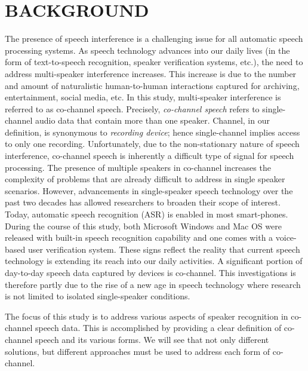 
\chapter{BACKGROUND}
\label{chap:intro}
 
The presence of speech interference is a challenging issue for all automatic speech processing systems. 
As speech technology advances into our daily lives (in the form of text-to-speech recognition, speaker verification systems, etc.), the need to address multi-speaker interference increases. 
This increase is due to the number and amount of naturalistic human-to-human interactions captured for archiving, entertainment, social media, etc. 
In this study, multi-speaker interference is referred to as co-channel speech. 
Precisely, {\it co-channel speech} refers to single-channel audio data that contain more than one speaker. 
Channel, in our definition, is synonymous to {\it recording device}; hence single-channel implies access to only one recording. 
Unfortunately, due to the non-stationary nature of speech interference, co-channel speech is inherently a difficult type of signal for speech processing. 
The presence of multiple speakers in co-channel increases the complexity of problems that are already difficult to address in single speaker scenarios. 
However, advancements in single-speaker speech technology over the past two decades has allowed researchers to broaden their scope of interest. 
Today, automatic speech recognition (ASR) is enabled in most smart-phones. 
During the course of this study, both Microsoft Windows and Mac OS were released with built-in speech recognition capability and one comes with a voice-based user verification system. 
These signs reflect the reality that current speech technology is extending its reach into our daily activities. 
A significant portion of day-to-day speech data captured by devices is co-channel. 
This investigations is therefore partly due to the rise of a new age in speech technology where research is not limited to isolated single-speaker conditions. 

The focus of this study is to address various aspects of speaker recognition in co-channel speech data. 
This is accomplished by providing a clear definition of co-channel speech and its various forms. 
We will see that not only different solutions, but different approaches must be used to address each form of co-channel. 





